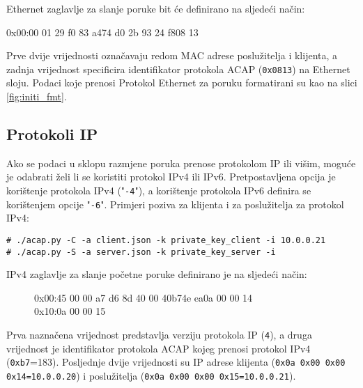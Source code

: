 Ethernet zaglavlje za slanje poruke \initi{} bit će definirano na sljedeći
način: \\
\begin{footnotesize}
\begin{monoblock}
\noindent 0x00:\colorbox{blue!30}{00 01 29 f0 83 a4}\colorbox{yellow!30}{74 d0 2b 93 24 f8}\colorbox{orange!30}{08 13}
\end{monoblock}
\end{footnotesize}

Prve dvije vrijednosti označavaju redom MAC adrese poslužitelja i
klijenta, a zadnja vrijednost specificira identifikator protokola ACAP
(\texttt{0x0813}) na Ethernet sloju. Podaci koje prenosi Protokol Ethernet za
poruku \initi{} formatirani su kao na slici \ref{fig:initi_fmt}.

\subsection{Protokoli IP}
Ako se podaci u sklopu razmjene poruka prenose protokolom IP ili višim, moguće je
odabrati želi li se koristiti protokol IPv4 ili IPv6. Pretpostavljena opcija je
korištenje protokola IPv4 ("\texttt{-4}"), a korištenje protokola IPv6 definira
se korištenjem opcije "\texttt{-6}". Primjeri poziva za
klijenta i za poslužitelja za protokol IPv4:
\begin{footnotesize}
\begin{verbatim}
# ./acap.py -C -a client.json -k private_key_client -i 10.0.0.21
# ./acap.py -S -a server.json -k private_key_server -i
\end{verbatim}
\end{footnotesize}

IPv4 zaglavlje za slanje početne poruke definirano je na sljedeći način:
\begin{figure}[H]
\begin{footnotesize}
\begin{monoblock}
\noindent 0x00:\colorbox{blue!30}{4}5 00 00 a7 d6 8d 40 00 40\colorbox{yellow!30}{b7}4e ea\colorbox{orange!30}{0a 00 00 14} \\
0x10:\colorbox{purple!30}{0a 00 00 15}
\end{monoblock}
\end{footnotesize}
\vspace{-10pt}
\end{figure}

Prva naznačena vrijednost predstavlja verziju protokola IP (\texttt{4}), a druga
vrijednost je identifikator protokola ACAP kojeg prenosi protokol IPv4
(\texttt{0xb7}=183). Posljednje dvije vrijednosti su IP adrese klijenta
(\texttt{0x0a 0x00 0x00 0x14=10.0.0.20}) i poslužitelja (\texttt{0x0a 0x00 0x00
0x15=10.0.0.21}).

